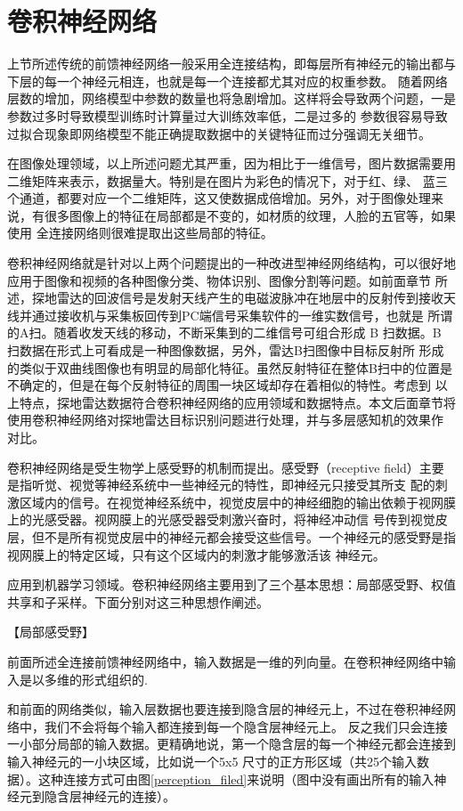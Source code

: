 \section{卷积神经网络}
上节所述传统的前馈神经网络一般采用全连接结构，即每层所有神经元的输出都与下层的每一个神经元相连，也就是每一个连接都尤其对应的权重参数。
随着网络层数的增加，网络模型中参数的数量也将急剧增加。这样将会导致两个问题，一是参数过多时导致模型训练时计算量过大训练效率低，二是过多的
参数很容易导致过拟合现象即网络模型不能正确提取数据中的关键特征而过分强调无关细节。

在图像处理领域，以上所述问题尤其严重，因为相比于一维信号，图片数据需要用二维矩阵来表示，数据量大。特别是在图片为彩色的情况下，对于红、绿、
蓝三个通道，都要对应一个二维矩阵，这又使数据成倍增加。另外，对于图像处理来说，有很多图像上的特征在局部都是不变的，如材质的纹理，人脸的五官等，如果使用
全连接网络则很难提取出这些局部的特征。

卷积神经网络就是针对以上两个问题提出的一种改进型神经网络结构，可以很好地应用于图像和视频的各种图像分类、物体识别、图像分割等问题。如前面章节
所述，探地雷达的回波信号是发射天线产生的电磁波脉冲在地层中的反射传到接收天线并通过接收机与采集板回传到PC端信号采集软件的一维实数信号，也就是
所谓的A扫。随着收发天线的移动，不断采集到的二维信号可组合形成 B 扫数据。B 扫数据在形式上可看成是一种图像数据，另外，雷达B扫图像中目标反射所
形成的类似于双曲线图像也有明显的局部化特征。虽然反射特征在整体B扫中的位置是不确定的，但是在每个反射特征的周围一块区域却存在着相似的特性。考虑到
以上特点，探地雷达数据符合卷积神经网络的应用领域和数据特点。本文后面章节将使用卷积神经网络对探地雷达目标识别问题进行处理，并与多层感知机的效果作
对比。

卷积神经网络是受生物学上感受野的机制而提出。感受野（receptive field）主要是指听觉、视觉等神经系统中一些神经元的特性，即神经元只接受其所支
配的刺激区域内的信号。在视觉神经系统中，视觉皮层中的神经细胞的输出依赖于视网膜上的光感受器。视网膜上的光感受器受刺激兴奋时，将神经冲动信
号传到视觉皮层，但不是所有视觉皮层中的神经元都会接受这些信号。一个神经元的感受野是指视网膜上的特定区域，只有这个区域内的刺激才能够激活该
神经元。
 
应用到机器学习领域。卷积神经网络主要用到了三个基本思想：局部感受野、权值共享和子采样。下面分别对这三种思想作阐述。

【局部感受野】

前面所述全连接前馈神经网络中，输入数据是一维的列向量。在卷积神经网络中输入是以多维的形式组织的.

和前面的网络类似，输入层数据也要连接到隐含层的神经元上，不过在卷积神经网络中，我们不会将每个输入都连接到每一个隐含层神经元上。
反之我们只会连接一小部分局部的输入数据。更精确地说，第一个隐含层的每一个神经元都会连接到输入神经元的一小块区域，比如说一个5x5
尺寸的正方形区域（共25个输入数据）。这种连接方式可由图\ref{perception_filed}来说明（图中没有画出所有的输入神经元到隐含层神经元的连接）。

